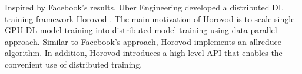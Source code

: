 Inspired by Facebook's results, Uber Engineering developed a distributed DL
training framework Horovod \cite{sergeev2018horovod}. 
The main motivation of Horovod is to scale single-GPU DL model training
into distributed model training using data-parallel approach. 
Similar to Facebook's approach, Horovod implements an allreduce algorithm. 
In addition, Horovod introduces a high-level API that enables
the convenient use of distributed training.  
